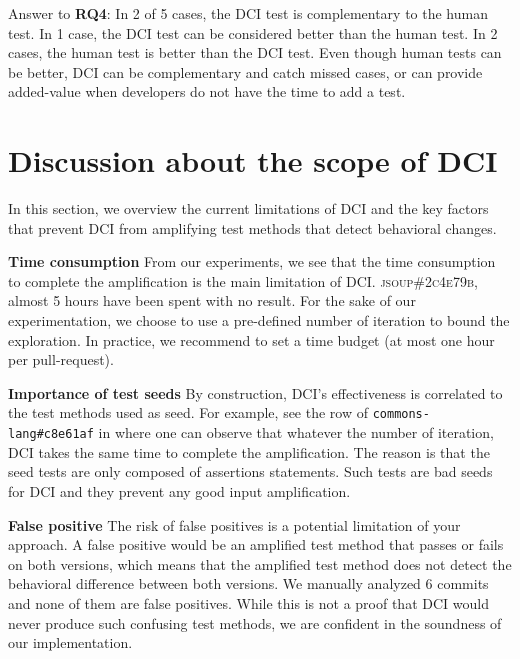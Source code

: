 \begin{mdframed}
Answer to \textbf{RQ4}: 
In 2 of 5 cases, the DCI test is complementary to the human test.
In 1 case, the DCI test can be considered better than the human test.
In 2 cases, the human test is better than the DCI test.
Even though human tests can be better, DCI can be complementary and catch missed cases, or can provide added-value when developers do not have the time to add a test.
\end{mdframed}



\section{Discussion about the scope of DCI}
\label{sec:limitation}

In this section, we overview the current limitations of DCI and the key factors that prevent DCI from amplifying test methods that detect behavioral changes.

\textbf{Time consumption}
From our experiments, we see that the time consumption to complete the amplification is the main limitation of DCI.
\textsc{jsoup\#2c4e79b}, almost 5 hours have been spent with no result.
For the sake of our experimentation, we choose to use a pre-defined number of iteration to bound the exploration.
In practice, we recommend to set a time budget (\eg at most one hour per pull-request).

\textbf{Importance of test seeds}
By construction, DCI's effectiveness is correlated to the test methods used as seed.
For example, see the row of \texttt{commons-lang\#c8e61af} in 
where one can observe that whatever the number of iteration, DCI takes the same time to complete the amplification.
The reason is that the seed tests are only composed of assertions statements.
Such tests are bad seeds for DCI and they prevent any good input amplification.

\textbf{False positive}
The risk of false positives is a potential  limitation of your approach.
A false positive would be an amplified test method that passes or fails on both versions, which means that the amplified test method does not detect the behavioral difference between both versions.
We manually  analyzed 6 commits and none of them are false positives.
While this is not a proof that DCI would never produce such confusing test methods, we are confident in the soundness of our implementation.


